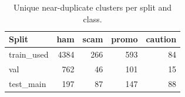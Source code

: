 \begin{table}[t]
\centering
\caption{Unique near-duplicate clusters per split and class.}
\label{tab:comp_clusters}
\small
\begin{tabular}{lrrrr}
\toprule
Split & ham & scam & promo & caution \\
\midrule
train_used & 4384 & 266 & 593 & 84 \\
val & 762 & 46 & 101 & 15 \\
test_main & 197 & 87 & 147 & 88 \\
\bottomrule
\end{tabular}
\end{table}
